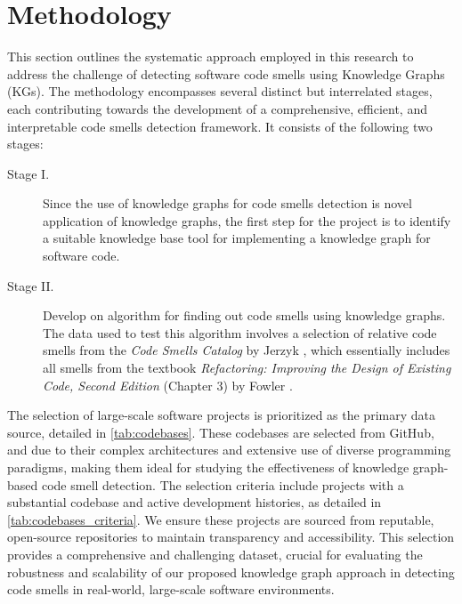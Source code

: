 \section{Methodology}
\label{sec:method}



This section outlines the systematic approach employed in this research to address the challenge of detecting software code smells using Knowledge Graphs (KGs). The methodology encompasses several distinct but interrelated stages, each contributing towards the development of a comprehensive, efficient, and interpretable code smells detection framework. It consists of the following two stages:

\begin{description}
    \item[Stage I.] Since the use of knowledge graphs for code smells detection is novel application of knowledge graphs, the first step for the project is to identify a suitable knowledge base tool for implementing a knowledge graph for software code.
    \item[Stage II.] Develop on algorithm for finding out code smells using knowledge graphs. The data used to test this algorithm involves a selection of relative code smells from the \textit{Code Smells Catalog} by Jerzyk \etal\cite{Jerzyk_2023}, which essentially includes all smells from the textbook \textit{Refactoring: Improving the Design of Existing Code, Second Edition} (Chapter 3) by Fowler \etal\cite{Martin_2018}.
\end{description}


The selection of large-scale software projects is prioritized as the primary data source,  detailed in \autoref{tab:codebases}. These codebases are selected from GitHub, and due to their complex architectures and extensive use of diverse programming paradigms, making them ideal for studying the effectiveness of knowledge graph-based code smell detection. The selection criteria include projects with a substantial codebase  and active development histories, as detailed in \autoref{tab:codebases_criteria}. We ensure these projects are sourced from reputable, open-source repositories to maintain transparency and accessibility. This selection provides a comprehensive and challenging dataset, crucial for evaluating the robustness and scalability of our proposed knowledge graph approach in detecting code smells in real-world, large-scale software environments.

